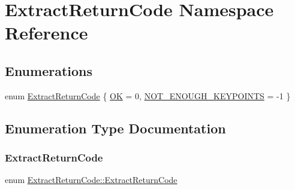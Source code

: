 \hypertarget{namespaceExtractReturnCode}{}\section{Extract\+Return\+Code Namespace Reference}
\label{namespaceExtractReturnCode}
\subsection*{Enumerations}
\begin{DoxyCompactItemize}
\item 
enum \hyperlink{namespaceExtractReturnCode_a88d3d56de717f250bf48793769dd57ba}{Extract\+Return\+Code} \{ \hyperlink{namespaceExtractReturnCode_a88d3d56de717f250bf48793769dd57baa35e3ef3fef8fcb5cc35f89bcdbf50d5a}{OK} = 0, 
\hyperlink{namespaceExtractReturnCode_a88d3d56de717f250bf48793769dd57baacc16e5e7772072e33bf927abd7c422c6}{N\+O\+T\+\_\+\+E\+N\+O\+U\+G\+H\+\_\+\+K\+E\+Y\+P\+O\+I\+N\+TS} = -\/1
 \}
\end{DoxyCompactItemize}


\subsection{Enumeration Type Documentation}
\mbox{\label{namespaceExtractReturnCode_a88d3d56de717f250bf48793769dd57ba}} 
\subsubsection{\texorpdfstring{Extract\+Return\+Code}{ExtractReturnCode}}
{\footnotesize\ttfamily enum \hyperlink{namespaceExtractReturnCode_a88d3d56de717f250bf48793769dd57ba}{Extract\+Return\+Code\+::\+Extract\+Return\+Code}}

